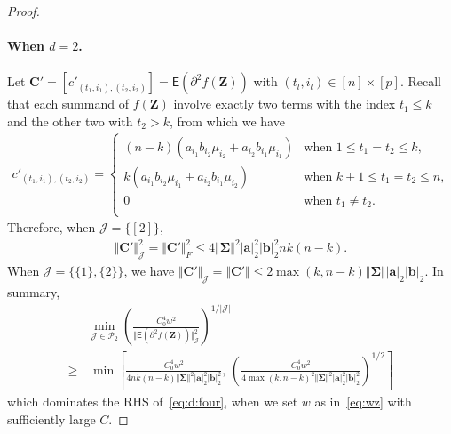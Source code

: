 \documentclass[11pt, a4paper]{article}
\newcommand{\mbf}{\mathbf}
\newcommand{\mc}{\mathcal}
\renewcommand{\l}{\left}
\renewcommand{\r}{\right}
\newcommand{\E}[0]{\mathsf{E}}
\theoremstyle{definition}
\theoremstyle{definition}
\theoremstyle{definition}
\theoremstyle{definition}
\theoremstyle{definition}
\theoremstyle{remark}
\theoremstyle{definition}
\theoremstyle{definition}
\theoremstyle{definition}
\begin{document}
\begin{proof}
\paragraph{When $d = 2$.} 
Let $\mbf C' = [c'_{(t_1, i_1), (t_2, i_2)}] = \E(\partial^2 f(\mbf Z))$ with $(t_l, i_l) \in [n] \times [p]$.
Recall that each summand of $f(\mbf Z)$ involve exactly two terms with the index $t_1 \le k$ and the other two with $t_2 > k$, from which we have 
\begin{align*}
c'_{(t_1, i_1), (t_2, i_2)} = \l\{ \begin{array}{ll}
(n - k)(a_{i_1} b_{i_2} \mu_{i_2}  + a_{i_2} b_{i_1} \mu_{i_1}) & \text{when \ } 1 \le t_1 = t_2 \le k, \\
k( a_{i_1} b_{i_2} \mu_{i_1}  + a_{i_2} b_{i_1} \mu_{i_2} ) & \text{when \ } k + 1 \le t_1 = t_2 \le n, \\
0 & \text{when \ } t_1 \ne t_2. \\
\end{array}\r.
\end{align*}
Therefore, when $\mc J = \{[2]\}$,
\begin{align*}
\Vert \mbf C' \Vert_{\mc J}^2 = \Vert \mbf C' \Vert_F^2 \le 4 \Vert \bm\Sigma \Vert^2 \vert \mbf a \vert_2^2 \vert \mbf b \vert_2^2 n k (n - k).
\end{align*}
When $\mc J = \{\{1\}, \{2\}\}$, we have $\Vert \mbf C' \Vert_{\mc J} = \Vert \mbf C' \Vert \le 2 \max(k, n-k)\Vert \bm\Sigma \Vert \vert \mbf a \vert_2 \vert \mbf b \vert_2$.
In summary,
\begin{align*}
& \min_{\mc J \in \mc P_2} \l(\frac{C_0^4w^2}{\Vert \E(\partial^2 f(\mbf Z)) \Vert_{\mc J}^2} \r)^{1/\vert \mc J\vert} 
 \\
\ge & \, \min \l[ \frac{C_0^4 w^2}{4 n k (n - k) \Vert \bm\Sigma \Vert^2 \vert \mbf a \vert_2^2 \vert \mbf b \vert_2^2}, \, \l( \frac{C_0^4w^2}{4 \max(k, n-k)^2 \Vert \bm\Sigma \Vert^2 \vert \mbf a \vert_2^2 \vert \mbf b \vert_2^2} \r)^{1/2} \r]
\end{align*}
which dominates the RHS of~\eqref{eq:d:four}, when we set $w$ as in~\eqref{eq:wz} with sufficiently large $C$.
\medskip

\end{proof}
\end{document}
